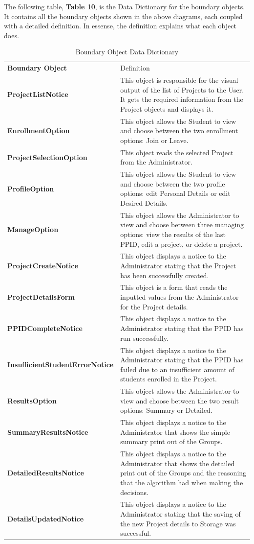 \documentclass[12pt,letterpaper]{article}
\begin{document}
\newpage{}

The following table, {\bf Table 10}, is the Data Dictionary for the boundary objects. It contains all the boundary objects shown in the above diagrams, each coupled with a detailed definition.
In essense, the definition explains what each object does.

\begin{table}[H]
\caption{Boundary Object Data Dictionary}
	\begin{tabu} to 
		\tableheader{}Boundary Object & Definition\\
		ProjectListNotice & 
			This object is responsible for the visual output of the list of Projects to the User. It gets the required information from the Project objects and displays it.\\
		EnrollmentOption & 
			This object allows the Student to view and choose between the two enrollment options: Join or Leave.\\
		ProjectSelectionOption & 
			This object reads the selected Project from the Administrator.\\
		ProfileOption & 
			This object allows the Student to view and choose between the two profile options: edit Personal Details or edit Desired Details.\\
		ManageOption & 
			This object allows the Administrator to view and choose between three managing options: view the results of the last PPID, edit a project, or delete a project.\\
		ProjectCreateNotice & 
			This object displays a notice to the Administrator stating that the Project has been successfully created.\\
		ProjectDetailsForm & 
			This object is a form that reads the inputted values from the Administrator for the Project details.\\
		PPIDCompleteNotice & 
			This object displays a notice to the Administrator stating that the PPID has run successfully.\\
		InsufficientStudentErrorNotice & 
			This object displays a notice to the Administrator stating that the PPID has failed due to an insufficient amount of students enrolled in the Project.\\
		ResultsOption & 
			This object allows the Administrator to view and choose between the two result options: Summary or Detailed.\\
		SummaryResultsNotice & 
			This object displays a notice to the Administrator that shows the simple summary print out of the Groups.\\
		DetailedResultsNotice & 
			This object displays a notice to the Administrator that shows the detailed print out of the Groups and the reasoning that the algorithm had when making the decisions.\\
		DetailsUpdatedNotice & 
			This object displays a notice to the Administrator stating that the saving of the new Project details to Storage was successful.\\
	\end{tabu}
\end{table}
\end{document}

